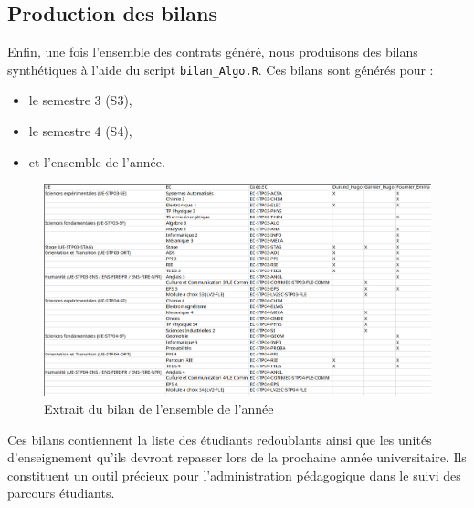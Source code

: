 \subsection{Production des bilans}

Enfin, une fois l’ensemble des contrats généré, nous produisons des bilans synthétiques à l’aide du script \texttt{bilan\_Algo.R}. Ces bilans sont générés pour :
\begin{itemize}
    \item le semestre 3 (S3),
    \item le semestre 4 (S4),
    \item et l’ensemble de l’année.
\end{itemize}

\begin{figure}[H]
  \centering
  \includegraphics[width=\linewidth]{images/bilan.png}
  \caption{Extrait du bilan de l'ensemble de l'année}
  \label{generation_bilan}
\end{figure}

Ces bilans contiennent la liste des étudiants redoublants ainsi que les unités d’enseignement qu’ils devront repasser lors de la prochaine année universitaire. Ils constituent un outil précieux pour l’administration pédagogique dans le suivi des parcours étudiants.
